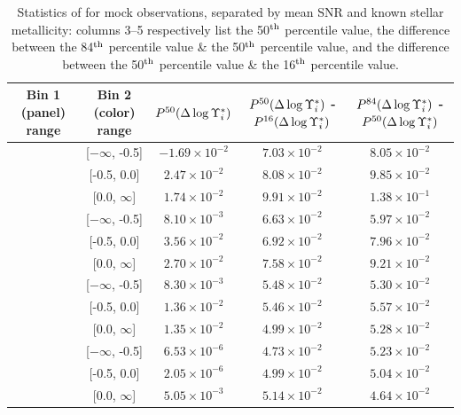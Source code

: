 \begin{table}[p]
    \centering
    \begin{tabular}{||c|c|c|c|c||} \hline \hline
        Bin 1 (panel) range & Bin 2 (color) range & $P^{50}(\Delta \log \Upsilon^*_{i})$ & $P^{50}(\Delta \log \Upsilon^*_{i})$  - $P^{16}(\Delta \log \Upsilon^*_{i})$ & $P^{84}(\Delta \log \Upsilon^*_{i})$ - $P^{50}(\Delta \log \Upsilon^*_{i})$ \\ \hline \hline
        [$-\infty$, 2.0] & [$-\infty$, -0.5] & $-1.69 \times 10^{-2}$ & $7.03 \times 10^{-2}$ & $8.05 \times 10^{-2}$ \\ \hline
        [$-\infty$, 2.0] & [-0.5, 0.0] & $2.47 \times 10^{-2}$ & $8.08 \times 10^{-2}$ & $9.85 \times 10^{-2}$ \\ \hline
        [$-\infty$, 2.0] & [0.0, $\infty$] & $1.74 \times 10^{-2}$ & $9.91 \times 10^{-2}$ & $1.38 \times 10^{-1}$ \\ \hline
        [2.0, 10.0] & [$-\infty$, -0.5] & $8.10 \times 10^{-3}$ & $6.63 \times 10^{-2}$ & $5.97 \times 10^{-2}$ \\ \hline
        [2.0, 10.0] & [-0.5, 0.0] & $3.56 \times 10^{-2}$ & $6.92 \times 10^{-2}$ & $7.96 \times 10^{-2}$ \\ \hline
        [2.0, 10.0] & [0.0, $\infty$] & $2.70 \times 10^{-2}$ & $7.58 \times 10^{-2}$ & $9.21 \times 10^{-2}$ \\ \hline
        [10.0, 20.0] & [$-\infty$, -0.5] & $8.30 \times 10^{-3}$ & $5.48 \times 10^{-2}$ & $5.30 \times 10^{-2}$ \\ \hline
        [10.0, 20.0] & [-0.5, 0.0] & $1.36 \times 10^{-2}$ & $5.46 \times 10^{-2}$ & $5.57 \times 10^{-2}$ \\ \hline
        [10.0, 20.0] & [0.0, $\infty$] & $1.35 \times 10^{-2}$ & $4.99 \times 10^{-2}$ & $5.28 \times 10^{-2}$ \\ \hline
        [20.0, $\infty$] & [$-\infty$, -0.5] & $6.53 \times 10^{-6}$ & $4.73 \times 10^{-2}$ & $5.23 \times 10^{-2}$ \\ \hline
        [20.0, $\infty$] & [-0.5, 0.0] & $2.05 \times 10^{-6}$ & $4.99 \times 10^{-2}$ & $5.04 \times 10^{-2}$ \\ \hline
        [20.0, $\infty$] & [0.0, $\infty$] & $5.05 \times 10^{-3}$ & $5.14 \times 10^{-2}$ & $4.64 \times 10^{-2}$ \\ \hline
    \end{tabular}
    \caption[Statistics of  for mock observations, separated by mean SNR and known stellar metallicity]{\fixspacing Statistics of  for mock observations, separated by mean SNR and known stellar metallicity: columns 3--5 respectively list the 50$^{\rm th}$ percentile value, the difference between the 84$^{\rm th}$ percentile value \& the 50$^{\rm th}$ percentile value, and the difference between the 50$^{\rm th}$ percentile value \& the 16$^{\rm th}$ percentile value.}
    \label{tab:mocks_snr_Z_devMLi}
\end{table}

